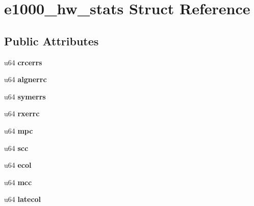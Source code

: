 \hypertarget{structe1000__hw__stats}{
\section{e1000\_\-hw\_\-stats Struct Reference}
\label{structe1000__hw__stats}
}
\subsection*{Public Attributes}
\begin{DoxyCompactItemize}
\item 
\hypertarget{structe1000__hw__stats_a610077aefcd9fc86007ba3e5269d9322}{
u64 {\bfseries crcerrs}}
\label{structe1000__hw__stats_a610077aefcd9fc86007ba3e5269d9322}

\item 
\hypertarget{structe1000__hw__stats_ae1edb6725c93494bf1e4af198e49862c}{
u64 {\bfseries algnerrc}}
\label{structe1000__hw__stats_ae1edb6725c93494bf1e4af198e49862c}

\item 
\hypertarget{structe1000__hw__stats_a0bff6486b2585b660cd1bba3fadd3bfd}{
u64 {\bfseries symerrs}}
\label{structe1000__hw__stats_a0bff6486b2585b660cd1bba3fadd3bfd}

\item 
\hypertarget{structe1000__hw__stats_a325f24e7901331d61a552ff930d3cb8a}{
u64 {\bfseries rxerrc}}
\label{structe1000__hw__stats_a325f24e7901331d61a552ff930d3cb8a}

\item 
\hypertarget{structe1000__hw__stats_a00835e6b3eca3adf5c59d6c358f5e394}{
u64 {\bfseries mpc}}
\label{structe1000__hw__stats_a00835e6b3eca3adf5c59d6c358f5e394}

\item 
\hypertarget{structe1000__hw__stats_a8ee7df8bc35f82926dfcbfe5f42599fe}{
u64 {\bfseries scc}}
\label{structe1000__hw__stats_a8ee7df8bc35f82926dfcbfe5f42599fe}

\item 
\hypertarget{structe1000__hw__stats_aa85626312e40f9bd155252969af117b7}{
u64 {\bfseries ecol}}
\label{structe1000__hw__stats_aa85626312e40f9bd155252969af117b7}

\item 
\hypertarget{structe1000__hw__stats_a5800cb4a4d5a5d2c8a8a90d3fff74295}{
u64 {\bfseries mcc}}
\label{structe1000__hw__stats_a5800cb4a4d5a5d2c8a8a90d3fff74295}

\item 
\hypertarget{structe1000__hw__stats_a922791efc22ff46db9344b40e7084fe2}{
u64 {\bfseries latecol}}
\label{structe1000__hw__stats_a922791efc22ff46db9344b40e7084fe2}


\end{DoxyCompactItemize}
